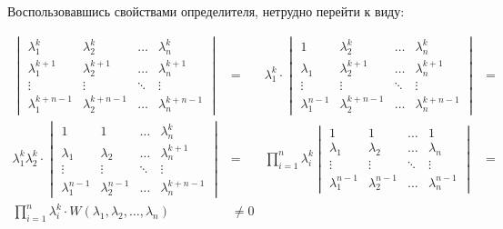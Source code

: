 \documentclass[10pt,a4paper]{article}
\begin{document}
	Воспользовавшись свойствами определителя, нетрудно перейти к виду:
	
	\begin{equation}
	\begin{aligned}
		\begin{vmatrix}
			\lambda_{1}^{k} & \lambda_{2}^{k} & \ldots & \lambda_{n}^{k} \\
			\lambda_{1}^{k + 1} & \lambda_{2}^{k + 1} & \ldots & 
			\lambda_{n}^{k + 1} \\
			\vdots & \vdots & \ddots & \vdots \\
			\lambda_{1}^{k + n - 1} & \lambda_{2}^{k + n - 1} & \ldots &
			\lambda_{n}^{k + n - 1}
		\end{vmatrix} &=&
		\lambda_{1}^{k}\cdot
		\begin{vmatrix}
			1 & \lambda_{2}^{k} & \ldots & \lambda_{n}^{k} \\
			\lambda_{1} & \lambda_{2}^{k + 1} & \ldots & 
			\lambda_{n}^{k + 1} \\
			\vdots & \vdots & \ddots & \vdots \\
			\lambda_{1}^{n - 1} & \lambda_{2}^{k + n - 1} & \ldots &
			\lambda_{n}^{k + n - 1}
		\end{vmatrix} &=& \\ 		
		\lambda_{1}^{k}\lambda_{2}^{k}\cdot
		\begin{vmatrix}
			1 & 1 & \ldots & \lambda_{n}^{k} \\
			\lambda_{1} & \lambda_{2} & \ldots & 
			\lambda_{n}^{k + 1} \\
			\vdots & \vdots & \ddots & \vdots \\
			\lambda_{1}^{n - 1} & \lambda_{2}^{n - 1} & \ldots &
			\lambda_{n}^{k + n - 1}
		\end{vmatrix} &=& \prod\limits_{i = 1}^{n}\lambda_{i}^{k}
		\begin{vmatrix}
			1 & 1 & \ldots & 1 \\
			\lambda_{1} & \lambda_{2} & \ldots & 
			\lambda_{n} \\
			\vdots & \vdots & \ddots & \vdots \\
			\lambda_{1}^{n - 1} & \lambda_{2}^{n - 1} & \ldots &
			\lambda_{n}^{n - 1}
		\end{vmatrix} &=&
		\\ \prod\limits_{i = 1}^{n}\lambda_{i}^{k}\cdot W\left(
		\lambda_{1}, \lambda_{2}, \ldots, \lambda_{n}\right)&\neq 0
	\end{aligned}
	\end{equation}
	
\end{document}
